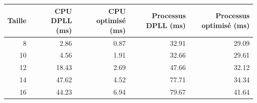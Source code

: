 \begin{tabular}{rrrrr}
\toprule
Taille & CPU DPLL (ms) & CPU optimisé (ms) & Processus DPLL (ms) & Processus optimisé (ms) \\
\midrule
8 & 2.86 & 0.87 & 32.91 & 29.09 \\
10 & 4.56 & 1.91 & 32.66 & 29.61 \\
12 & 18.43 & 2.69 & 47.66 & 32.12 \\
14 & 47.62 & 4.52 & 77.71 & 34.34 \\
16 & 44.23 & 6.94 & 79.67 & 41.64 \\
\bottomrule
\end{tabular}
